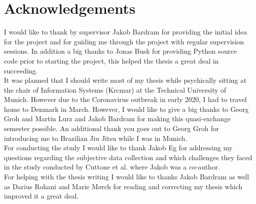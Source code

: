 \chapter{Acknowledgements}
I would like to thank by supervisor Jakob Bardram for providing the initial idea for the project and for guiding me through the project with regular supervision sessions. In addition a big thanks to Jonas Busk for providing Python source code prior to starting the project, this helped the thesis a great deal in succeeding.\\

It was planned that I should write most of my thesis while psychically sitting at the chair of Information Systems (Krcmar) at the Technical University of Munich. However due to the Coronavirus outbreak in early 2020, I had to travel home to Denmark in March. However, I would like to give a big thanks to Georg Groh and Martin Lurz and Jakob Bardram for making this quasi-exchange semester possible. An additional thank you goes out to Georg Groh for introducing me to Brazilian Jiu Jitsu while I was in Munich.\\

For conducting the study I would like to thank Jakob Eg for addressing my questions regarding the subjective data collection and which challenges they faced in the study conducted by Cuttone et al. \cite{sparse-location-2014} where Jakob was a co-author.\\

For helping with the thesis writing I would like to thanks Jakob Bardram as well as Darius Rohani and Marie Mørch for reading and correcting my thesis which improved it a great deal.\\
